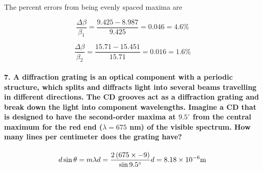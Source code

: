 \documentclass[11pt]{article}
\begin{document}
The percent errors from being evenly spaced maxima are

\[\frac{\Delta\beta}{\beta_1} = \frac{9.425-8.987}{9.425} = 0.046 = 4.6\%\]

\[\frac{\Delta\beta}{\beta_2} = \frac{15.71-15.451}{15.71} = 0.016 = 1.6\%\]

    \paragraph{\texorpdfstring{7. A diffraction grating is an optical
component with a periodic structure, which splits and diffracts light
into several beams travelling in different directions. The CD grooves
act as a diffraction grating and break down the light into component
wavelengths. Imagine a CD that is designed to have the second-order
maxima at \(9.5^{\circ}\) from the central maximum for the red end
(\(\lambda=675\) nm) of the visible spectrum. How many lines per
centimeter does the grating
have?}{7. A diffraction grating is an optical component with a periodic structure, which splits and diffracts light into several beams travelling in different directions. The CD grooves act as a diffraction grating and break down the light into component wavelengths. Imagine a CD that is designed to have the second-order maxima at 9.5\^{}\{\textbackslash{}circ\} from the central maximum for the red end (\textbackslash{}lambda=675 nm) of the visible spectrum. How many lines per centimeter does the grating have?}}\label{a-diffraction-grating-is-an-optical-component-with-a-periodic-structure-which-splits-and-diffracts-light-into-several-beams-travelling-in-different-directions.-the-cd-grooves-act-as-a-diffraction-grating-and-break-down-the-light-into-component-wavelengths.-imagine-a-cd-that-is-designed-to-have-the-second-order-maxima-at-9.5circ-from-the-central-maximum-for-the-red-end-lambda675-nm-of-the-visible-spectrum.-how-many-lines-per-centimeter-does-the-grating-have}

\[\begin{equation}
d \sin\theta = m \lambda \\
\\
d = \frac{2\left(675\times{-9}\right)}{\sin9.5^{\circ}} \\
\\
d = 8.18\times10^{-6} \rm{m}\\
\end{equation}
\]
\end{document}
